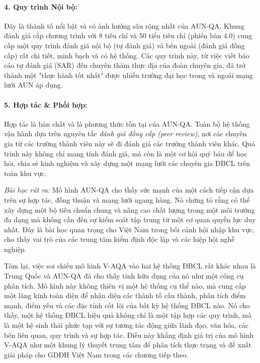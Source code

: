 \documentclass[12pt, a4paper, openany]{report}
\begin{document}
\paragraph{4. Quy trình Nội bộ:} Đây là thành tố nổi bật và có ảnh hưởng sâu rộng nhất của AUN-QA. Khung đánh giá cấp chương trình với 8 tiêu chí và 50 tiểu tiêu chí (phiên bản 4.0) cung cấp một quy trình đánh giá nội bộ (tự đánh giá) và bên ngoài (đánh giá đồng cấp) rất chi tiết, minh bạch và có hệ thống. Các quy trình này, từ việc viết báo cáo tự đánh giá (SAR) đến chuyến thăm thực địa của đoàn chuyên gia, đã trở thành một "thực hành tốt nhất" được nhiều trường đại học trong và ngoài mạng lưới AUN áp dụng.

\paragraph{5. Hợp tác \& Phối hợp:} Hợp tác là bản chất và là phương thức tồn tại của AUN-QA. Toàn bộ hệ thống vận hành dựa trên nguyên tắc \textit{đánh giá đồng cấp (peer review)}, nơi các chuyên gia từ các trường thành viên này sẽ đi đánh giá các trường thành viên khác. Quá trình này không chỉ mang tính đánh giá, mà còn là một cơ hội quý báu để học hỏi, chia sẻ kinh nghiệm và xây dựng một mạng lưới các chuyên gia ĐBCL trên toàn khu vực.

\textit{Bài học rút ra:} Mô hình AUN-QA cho thấy sức mạnh của một cách tiếp cận dựa trên sự hợp tác, đồng thuận và mạng lưới ngang hàng. Nó chứng tỏ rằng có thể xây dựng một bộ tiêu chuẩn chung và nâng cao chất lượng trong một môi trường đa dạng mà không cần đến sự kiểm soát tập trung từ một cơ quan quyền lực duy nhất. Đây là bài học quan trọng cho Việt Nam trong bối cảnh hội nhập khu vực, cho thấy vai trò của các trung tâm kiểm định độc lập và các hiệp hội nghề nghiệp.

\bigskip %

Tóm lại, việc soi chiếu mô hình V-AQA vào hai hệ thống ĐBCL rất khác nhau là Trung Quốc và AUN-QA đã cho thấy tính hữu dụng của nó như một công cụ phân tích. Mô hình này không thiên vị một hệ thống cụ thể nào, mà cung cấp một lăng kính toàn diện để nhận diện các thành tố cấu thành, phân tích điểm mạnh, điểm yếu và các đặc tính cốt lõi của bất kỳ hệ thống ĐBCL nào. Nó cho thấy, một hệ thống ĐBCL hiệu quả không chỉ là một tập hợp các quy trình, mà là một hệ sinh thái phức tạp với sự tương tác động giữa lãnh đạo, văn hóa, các bên liên quan, quy trình và sự hợp tác. Điều này khẳng định giá trị của mô hình V-AQA như một khung lý thuyết trung tâm để phân tích thực trạng và đề xuất giải pháp cho GDĐH Việt Nam trong các chương tiếp theo.
\end{document}
